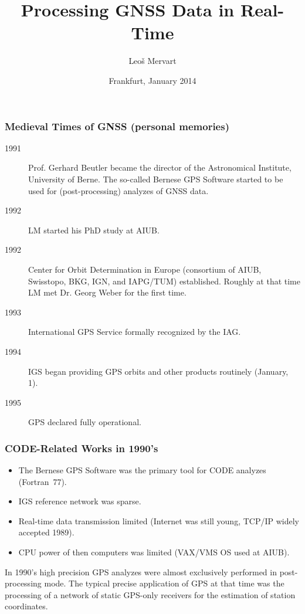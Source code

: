 \documentclass[10pt]{beamer}
\title{Processing GNSS Data in Real-Time}
\author{Leo\v{s} Mervart}
\institute{TU Prague}
\date{Frankfurt, January 2014}
\begin{document}

\begin{frame}
  \titlepage
\end{frame}


\begin{frame}
\frametitle{Medieval Times of GNSS (personal memories)}

\begin{description}
\item[1991] Prof. Gerhard Beutler became the director of the Astronomical Institute, University of
  Berne. The so-called Bernese GPS Software started to be used for (post-processing) analyzes of
  GNSS data.
\item[1992] LM started his PhD study at AIUB.
\item[1992] Center for Orbit Determination in Europe (consortium of AIUB, Swisstopo, BKG, IGN, and
  IAPG/TUM) established. Roughly at that time LM met Dr. Georg Weber for the first time.
\item[1993] International GPS Service formally recognized by the IAG.
\item[1994] IGS began providing GPS orbits and other products routinely (January, 1).
\item[1995] GPS declared fully operational.
\end{description}

\end{frame}


\begin{frame}
\frametitle{CODE-Related Works in 1990's}

\begin{itemize}
\item The Bernese GPS Software was the primary tool for CODE analyzes (Fortran~77).
\item IGS reference network was sparse.
\item Real-time data transmission limited (Internet was still young, TCP/IP widely accepted 1989).
\item CPU power of then computers was limited (VAX/VMS OS used at AIUB).
\end{itemize}

In 1990's high precision GPS analyzes were almost exclusively performed in post-processing mode.
The typical precise application of GPS at that time was the processing of a network of static
GPS-only receivers for the estimation of station coordinates.

\end{frame}
\end{document}
